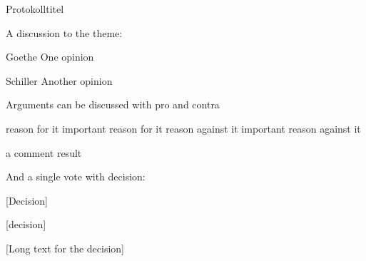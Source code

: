 \documentclass[ngerman]{scrartcl}
\begin{document}
\begin{Minutes}{Protokolltitel}
		
		A discussion to the theme:
		\begin{Opinions}
		\item[Goethe] One opinion
		\item[Schiller] Another opinion
		\end{Opinions}
		
		Arguments can be discussed with pro and contra
		\begin{Argumentation}
		\pro reason for it
		\Pro important reason for it
		\contra reason against it
		\Contra important reason against it
		\item a comment
		\result result
		\end{Argumentation}
		
		
		And a single vote with decision:\par
		
		[Decision]
		
		\begin{Vote}
		[decision]
		\end{Vote}
		
		[Long text for the decision]
	
	\end{Minutes}
\end{document}
